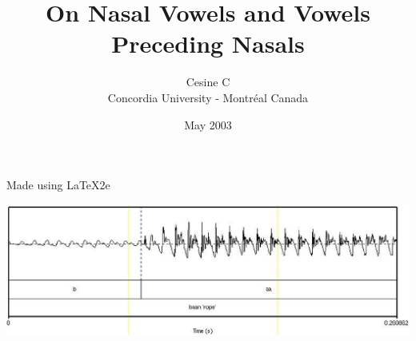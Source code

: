\documentclass[10pt,twoside]{article}
\begin{document}
\pagestyle{headings}

\title{On Nasal Vowels and Vowels Preceding Nasals}
\author{Cesine C\\Concordia University - Montr\'{e}al Canada}
\date{May 2003}
\maketitle
Made using \LaTeX2e{}

\includegraphics{baan.ps}
\end{document}
